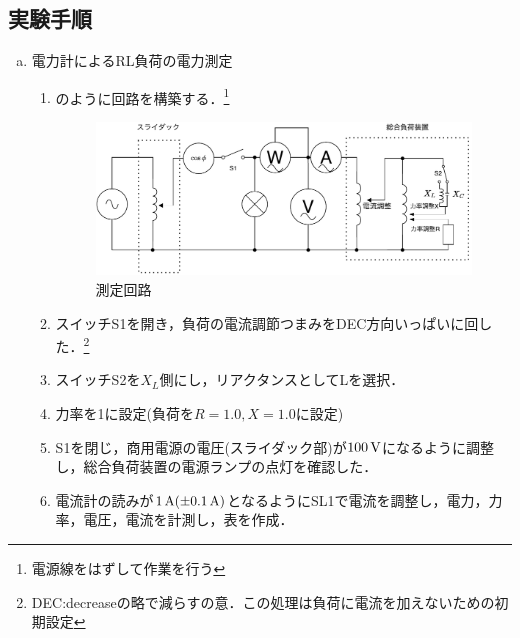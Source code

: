 \subsection{実験手順}
\begin{enumerate}[a)]
\item 電力計によるRL負荷の電力測定
\label{RLhuka}
\begin{enumerate}[(1)]
	\item {}のように回路を構築する．\footnote{電源線をはずして作業を行う}
	\begin{figure}[h]
	\centering
	\includegraphics[scale=1]{./fig/circ.pdf}
	\caption{測定回路}
	\label{fig:circ}
\end{figure}
\item スイッチS1を開き，負荷の電流調節つまみをDEC方向いっぱいに回した．\footnote{DEC:decreaseの略で減らすの意．この処理は負荷に電流を加えないための初期設定}
\item スイッチS2を$X_{L}$側にし，リアクタンスとしてLを選択．\label{S2}
\item 力率を1に設定(負荷を$R=1.0, X=1.0$に設定)
\item S1を閉じ，商用電源の電圧(スライダック部)が$100\,\rm{V}$になるように調整し，総合負荷装置の電源ランプの点灯を確認した．
\item 電流計の読みが$1\,\rm{A}(\pm 0.1\,\rm{A})$となるようにSL1で電流を調整し，電力，力率，電圧，電流を計測し，表を作成．


\end{enumerate}
\end{enumerate}
